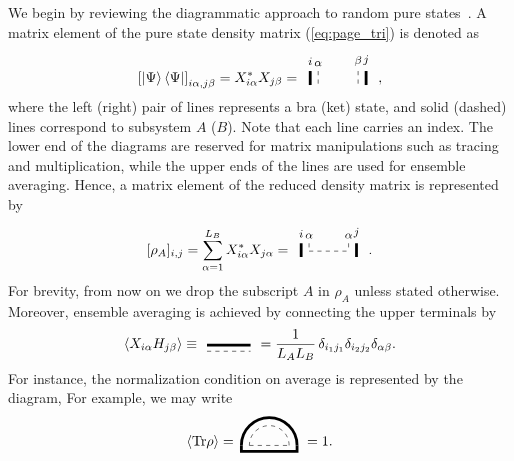 \documentclass[aps,pra,groupedaddress,twocolumn,notitlepage,superscriptaddress,10pt]{revtex4-1}
\newcommand{\Tr}{\text{Tr}}
\begin{document}
We begin by reviewing the diagrammatic approach to random pure states~\cite{Jurkiewicz,Zee1995}.
A matrix element of the pure state density matrix (\ref{eq:page_tri}) is denoted as
\begin{align}
    \left[\ket{\Psi}\bra{\Psi}\right]_{i\alpha,j\beta}= X_{i\alpha}^\ast X_{j\beta}
    =%
    \,
    \tikz[baseline=-0.5ex]{
    \draw[dashed] (0,0.2) node[align=center, above] {\footnotesize $\alpha$} -- (0,-0.2);
    \draw[dashed] (1,0.2) node[align=center, above] {\footnotesize $\beta$} -- (1,-0.2);
    \draw[line width=2] (-0.2,0.2) node[align=center, above] {\footnotesize $i$} -- (-0.2,-0.15);
    \draw[line width=2] (1.2,0.2) node[align=center, above] {\footnotesize $j$} -- (1.2,-0.15);
    }\ ,
\end{align}
where the left (right) pair of lines represents a bra (ket) state, and solid (dashed) lines correspond to subsystem $A$ ($B$). Note that each line carries an index. The lower end of the diagrams are reserved for matrix manipulations such as tracing and multiplication, while the upper ends of the lines are used for ensemble averaging.
Hence, a matrix element of the reduced density matrix is represented by
\begin{align}
    \label{eq:rho_diag}
    [\rho_A]_{i,j}= 
    {\sum_{\alpha=1}^{L_B} X_{i\alpha}^\ast X_{j\alpha}}
= %
\,
    \tikz[baseline=-0.5ex]{
    \draw[dashed] (0,0.2) node[align=center, above] {\footnotesize $\alpha$} -- (0,0);
    \draw[dashed] (0,0)  -- (1,0);
    \draw[dashed]  (1,0.2) node[align=center, above] {\footnotesize $\alpha$} -- (1,0);
    \draw[line width=2] (-0.2,0.2) node[align=center, above] {\footnotesize $i$} -- (-0.2,-0.15);
    \draw[line width=2] (1.2,0.2) node[align=center, above] {\footnotesize $j$} -- (1.2,-0.15);
    }\ .
\end{align}
For brevity, from now on we drop the subscript $A$ in $\rho_A$ unless stated otherwise.
Moreover, ensemble averaging is achieved by connecting the upper terminals by
\begin{align}
\braket{X_{i \alpha} H_{j \beta}} \equiv
\
\tikz[baseline=-0.8ex,scale=1]{
    \draw[line width=2] (0,-0.05)--(1.1,-0.05);
    \draw[dashed] (0,-0.2)--(1.1,-0.2);
    }
    \ 
    =\frac{1}{L_{A} L_B}\, \delta_{i_1 j_1} \delta_{i_2 j_2} \delta_{\alpha\beta}.
\end{align} 
For instance, the normalization condition on average is represented by the diagram,
For example, we may write
\begin{align}
    \braket{\Tr\rho}=
    \,
    \tikz[baseline=0ex]{
    \draw[dashed] (1.0,0) arc (0:180:0.5);
    \draw[dashed] (0,0) -- (1,0);
    \draw[line width=2] (1.2,0.) arc (0:180:0.7);
    \draw[line width=2] (-0.2,0.0)-- (-0.2,-0.15)--(1.2,-0.15)-- (1.2,0.0);
    }\ = 1.
\end{align}
\end{document}

